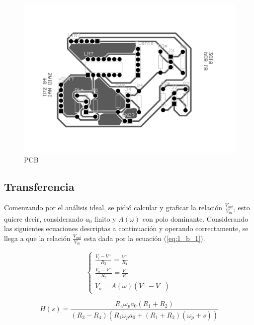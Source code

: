 \begin{figure}[H]
\begin{centering}
\includegraphics[scale=0.3]{../Ex1/iB/Resources1b/PCB}
\par\end{centering}
\caption{PCB}
\label{1_b_3}

\end{figure}

\subsection{Transferencia}

Comenzando por el análisis ideal, se pidió calcular y graficar la
relación $\frac{V_{out}}{V_{in}}$, esto quiere decir, considerando
$a_{0}$ finito y $A(\omega)$ con polo dominante. Considerando las
siguientes ecuaciones descriptas a continuación y operando correctamente,
se llega a que la relación $\frac{V_{out}}{V_{in}}$ esta dada por
la ecuación (\ref{eq:1_b_1}).

\[
\left\{ \begin{array}{c}
\frac{V_{i}-V^{+}}{R_{3}}=\frac{V^{+}}{R_{4}}\\
\frac{V_{o}-V^{-}}{R_{2}}=\frac{V^{-}}{R_{1}}\\
V_{o}=A(\omega)(V^{+}-V^{-})
\end{array}\right.
\]

\begin{equation}
H(s)=\frac{R_{4}\omega_{p}a_{0}\left(R_{1}+R_{2}\right)}{\left(R_{3}-R_{4}\right)\left(R_{1}\omega_{p}a_{0}+\left(R_{1}+R_{2}\right)\left(\omega_{p}+s\right)\right)}\label{eq:1_b_1}
\end{equation}

